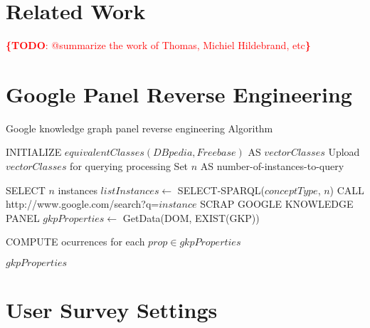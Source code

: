 \documentclass[runningheads,a4paper]{llncs}
\newcommand{\todo}[1]{\noindent\textcolor{red}{{\bf \{TODO}: #1{\bf \}}}}
\begin{document}

\section{Related Work}
\label{sec:related}
\todo{@summarize the work of Thomas, Michiel Hildebrand, etc}


\section{Google Panel Reverse Engineering}
\label{sec:reverse}


\begin{algorithm}[H]
\caption{Google knowledge graph panel reverse engineering Algorithm} \label{rankingvocab}
\begin{algorithmic}[1]
    \STATE INITIALIZE $equivalentClasses(DBpedia,Freebase) $ AS $vectorClasses$
    \STATE Upload $vectorClasses$ for querying processing
    \STATE Set $n$ AS number-of-instances-to-query
   
	\STATE SELECT $n$ instances
	\STATE $listInstances \leftarrow$ SELECT-SPARQL($conceptType$, $n$)
			\STATE CALL http://www.google.com/search?q=$instance$
			\STATE SCRAP GOOGLE KNOWLEDGE PANEL
			\STATE $gkpProperties \leftarrow$ GetData(DOM, EXIST(GKP))
			
		\ENDFOR
	\STATE COMPUTE ocurrences for each $prop \in gkpProperties$
    \ENDFOR
     
   
    \RETURN $gkpProperties$ 
     
\end{algorithmic}
\end{algorithm}


\section{User Survey Settings}
\label{sec:survey}

\end{document}
